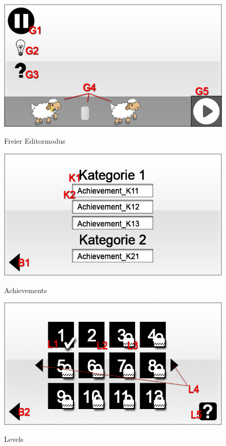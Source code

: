 \begin{figure}[H]
\centering
{}\label{fig:game_freemode}
\includegraphics[scale=0.55]{../gui/_jpeg_numeration/game_freemode.jpg}
\caption{Freier Editormodus}
\end{figure}

\begin{figure}[H]
\centering
{}\label{fig:achievments}
\includegraphics[scale=0.55]{../gui/_jpeg_numeration/achievements.jpg}
\caption{Achievements}
\end{figure}

\begin{figure}[H]
\centering
{}\label{fig:level}
\includegraphics[scale=0.55]{../gui/_jpeg_numeration/level.jpg}
\caption{Levels}
\end{figure}

